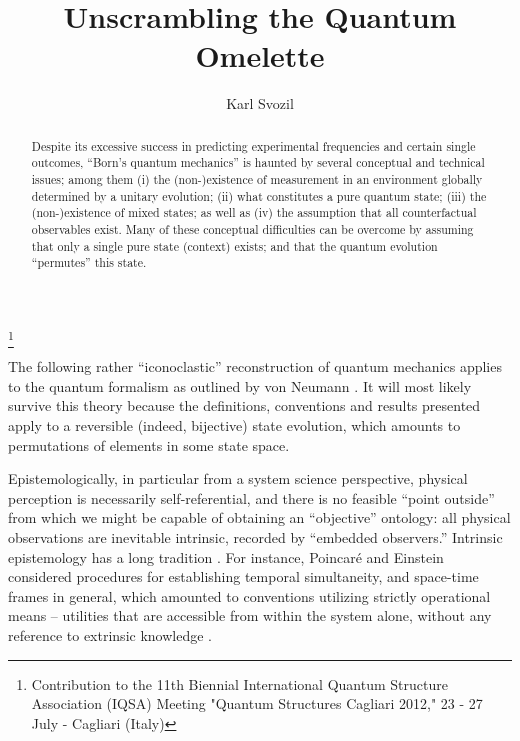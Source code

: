 \documentclass[%
  preprint,
 showpacs,
 showkeys,
 preprintnumbers,
 amsmath,amssymb,
 aps,
 prl,
  longbibliography,
 ]{revtex4-1}
\theoremstyle{definition}
\theoremstyle{remark}
\begin{document}
\title{Unscrambling the Quantum Omelette}


\author{Karl Svozil}
 
\thanks{Contribution to the 11th Biennial  International Quantum Structure Association  (IQSA) Meeting
"Quantum Structures Cagliari 2012," 23 - 27 July - Cagliari (Italy)}


\begin{abstract}
Despite its excessive success in predicting experimental frequencies and certain single outcomes,
``Born's quantum mechanics'' is haunted by several conceptual and technical issues; among them
(i) the (non-)existence of measurement in an environment globally determined by a unitary evolution;
(ii) what constitutes a pure quantum state;
(iii) the (non-)existence of mixed states;  as well as
(iv) the assumption that all counterfactual observables exist.
Many of these conceptual difficulties can be overcome by assuming that only a single pure state (context) exists;
and that the quantum evolution ``permutes'' this state.
\end{abstract}

\maketitle

The following rather ``iconoclastic'' reconstruction of quantum mechanics applies to the quantum formalism
as outlined by von Neumann \cite{v-neumann-49}.
It will most likely survive this theory
because the definitions, conventions and results presented apply to a reversible (indeed, bijective)
state evolution,
which amounts to permutations of elements in some state space.

Epistemologically, in particular from a system science perspective,
physical perception is necessarily self-referential,
and there is no feasible ``point outside'' from which we might be capable of
obtaining an ``objective'' ontology:
all physical observations are inevitable intrinsic,
recorded by ``embedded observers.''
Intrinsic epistemology has a long tradition \cite{bos1,toffoli:79,svozil-94}.
For instance, Poincar\'e and Einstein considered
procedures for establishing temporal simultaneity,
and space-time frames in general, which amounted to conventions utilizing
strictly operational means -- utilities that are accessible
from within the system alone, without any reference to
extrinsic knowledge \cite{Galison-2003,casar-poincare-convention}.
\end{document}
